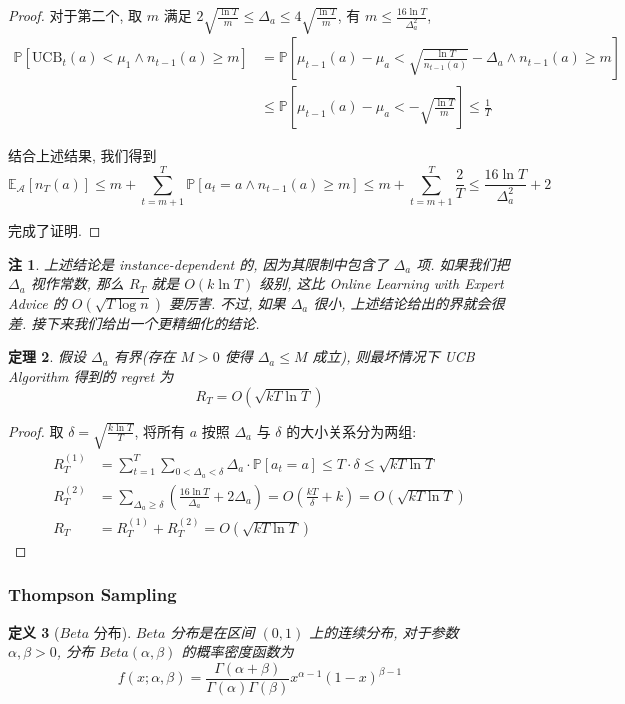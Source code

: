 \documentclass[8pt]{article}
\theoremstyle{compact}
\newtheorem{theorem}{定理}[section]
\newtheorem{definition}[theorem]{定义}
\newtheorem{remark}[theorem]{注}
\def\le{\leqslant}
\def\ge{\geqslant}
\def\P#1{\mathbb{P}\left[{#1}\right]}
\begin{document}
\begin{proof}
	对于第二个, 取 $m$ 满足 $2\sqrt{\frac{\ln T}{m}}\le \Delta_a \le 4\sqrt{\frac{\ln T}{m}}$, 有 $m \le \frac{16 \ln T}{\Delta_a^2}$, \begin{equation*}
		\begin{split}
			\P{\text{UCB}_t(a) < \mu_1 \wedge n_{t-1}(a) \ge m} &= \P{\mu_{t-1}(a) - \mu_a < \sqrt{\frac{\ln T}{n_{t-1}(a)}} - \Delta_a \wedge n_{t-1}(a) \ge m}\\
			&\le \P{\mu_{t-1}(a) - \mu_a < -\sqrt{\frac{\ln T}{m}}} \le \frac1T
		\end{split}
	\end{equation*}

	结合上述结果, 我们得到
	$$\mathbb E_{\mathcal A}[n_T(a)] \le m + \sum_{t=m+1}^T \P{a_t = a \wedge n_{t-1}(a) \ge m} \le m + \sum_{t=m+1}^T \frac2T \le \frac{16\ln T}{\Delta_a^2} + 2$$

	完成了证明.
\end{proof}
\begin{remark}
	上述结论是 instance-dependent 的, 因为其限制中包含了 $\Delta_a$ 项. 如果我们把 $\Delta_a$ 视作常数, 那么 $R_T$ 就是 $O(k\ln T)$ 级别, 这比 Online Learning with Expert Advice 的 $O(\sqrt{T\log n})$ 要厉害. 不过, 如果 $\Delta_a$ 很小, 上述结论给出的界就会很差. 接下来我们给出一个更精细化的结论.
\end{remark}
\begin{theorem}
	假设 $\Delta_a$ 有界(存在 $M > 0$ 使得 $\Delta_a \le M$ 成立), 则最坏情况下 UCB Algorithm 得到的 regret 为 $$R_T = O(\sqrt{kT\ln T})$$
\end{theorem}
\begin{proof}
	取 $\delta = \sqrt{\frac{k\ln T}{T}}$, 将所有 $a$ 按照 $\Delta_a$ 与 $\delta$ 的大小关系分为两组: \begin{equation*}
		\begin{split}
			R_T^{(1)} &= \sum_{t=1}^{T} \sum_{0 < \Delta_a < \delta} \Delta_a \cdot \P{a_t = a} \le T \cdot \delta \le \sqrt{kT\ln T}\\
			R_T^{(2)} &= \sum_{\Delta_a \ge \delta}\left(\frac{16\ln T}{\Delta_a} + 2\Delta_a\right) = O\left(\frac{kT}{\delta} + k\right) = O(\sqrt{kT\ln T})\\
			R_T &= R_T^{(1)} + R_T^{(2)} = O(\sqrt{kT\ln T})
		\end{split}
	\end{equation*}
\end{proof}

\subsubsection{Thompson Sampling}
\begin{definition}[$Beta$ 分布]
	$Beta$ 分布是在区间 $(0, 1)$ 上的连续分布, 对于参数 $\alpha, \beta > 0$, 分布 $Beta(\alpha, \beta)$ 的概率密度函数为 $$f(x; \alpha, \beta) = \frac{\Gamma(\alpha + \beta)}{\Gamma(\alpha)\Gamma(\beta)}x^{\alpha-1}(1-x)^{\beta-1}$$
\end{definition}
\end{document}
